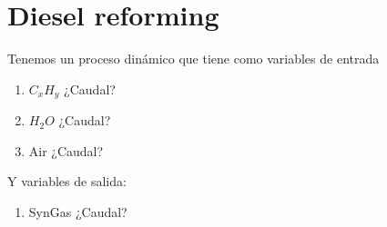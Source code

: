 \chapter{Diesel reforming}

Tenemos un proceso dinámico que tiene como variables de entrada 
\begin{enumerate}
    \item $C_x H_y$ ¿Caudal?
    \item $H_2O$ ¿Caudal?
    \item Air ¿Caudal?
\end{enumerate}

Y variables de salida:

\begin{enumerate}
    \item SynGas ¿Caudal?
\end{enumerate}